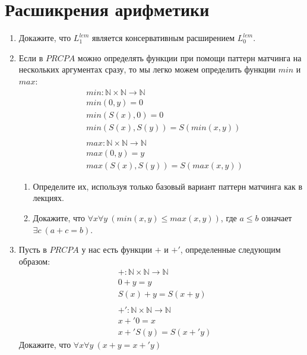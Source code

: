 \section*{Расшикрения арифметики}

\begin{enumerate}

\item Докажите, что $L_1^{lem}$ является консервативным расширением $L_0^{lem}$.

\item Если в $PRCPA$ можно определять функции при помощи паттерн матчинга на нескольких аргументах сразу, то мы легко можем определить функции $min$ и $max$:
\begin{align*}
& min : \mathbb{N} \times \mathbb{N} \to \mathbb{N} \\
& min(0,y) = 0 \\
& min(S(x),0) = 0 \\
& min(S(x),S(y)) = S(min(x,y)) \\
& \\
& max : \mathbb{N} \times \mathbb{N} \to \mathbb{N} \\
& max(0,y) = y \\
& max(S(x),S(y)) = S(max(x,y))
\end{align*}
\begin{enumerate}
\item Определите их, используя только базовый вариант паттерн матчинга как в лекциях.
\item Докажите, что $\forall x \forall y\ (min(x,y) \leq max(x,y))$, где $a \leq b$ означает $\exists c\ (a + c = b)$.
\end{enumerate}

\item Пусть в $PRCPA$ у нас есть функции $+$ и $+'$, определенные следующим образом:
\begin{align*}
& + : \mathbb{N} \times \mathbb{N} \to \mathbb{N} \\
& 0 + y = y \\
& S(x) + y = S(x + y) \\
& \\
& +' : \mathbb{N} \times \mathbb{N} \to \mathbb{N} \\
& x +' 0 = x \\
& x +' S(y) = S(x +' y)
\end{align*}
Докажите, что $\forall x \forall y\ (x + y = x +' y)$


\end{enumerate}
